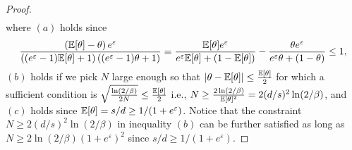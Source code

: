 \begin{proof}
\begin{align}
\end{align}
 where $(a)$ holds since 
 $$ \frac{\left(  \mathbb{E}[\theta]-\theta\right) e^\varepsilon}{\left((e^\varepsilon-1) \mathbb{E}[\theta]+1\right)\left((e^\varepsilon-1) \theta+1\right)} = \frac{\mathbb{E}[\theta]e^\varepsilon}{e^\varepsilon \mathbb{E}[\theta]+(1-\mathbb{E}[\theta])} -  \frac{\theta e^\varepsilon}{e^\varepsilon \theta+(1-\theta)} \leq 1,$$
 $(b)$ holds if we pick $N$ large enough so that $\left\lvert \theta - \mathbb{E}[\theta]\right\rvert \leq \frac{\mathbb{E}[\theta]}{2} $ for which a sufficient condition is $ \sqrt{\frac{\ln(2/\beta)}{2N}} \leq \frac{\mathbb{E}[\theta]}{2}  $ i.e., $N\geq \frac{2\ln(2/\beta)}{\mathbb{E}[\theta]^2} = 2(d/s)^2\ln(2/\beta)$,
and $(c)$ holds since $\mathbb{E}[\theta] = s/d \geq 1/(1+e^\varepsilon)$. Notice that the constraint $N\geq  2(d/s)^2 \ln(2/\beta)$ in inequality $(b)$ can be further satisfied as long as $ N \geq 2\ln(2/\beta)(1+e^\varepsilon)^2 $
since $s/d \geq 1/(1+e^\varepsilon)$.


\end{proof}
